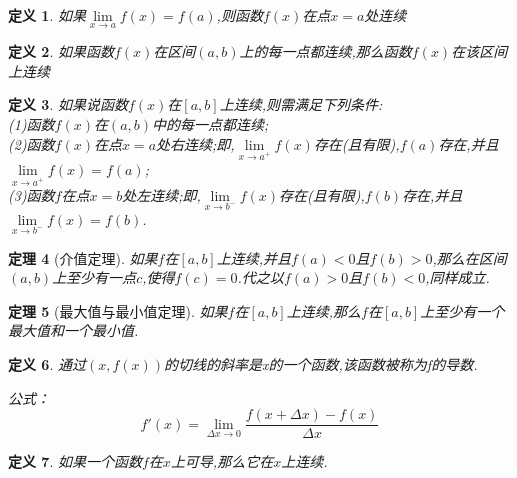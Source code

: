 \documentclass[UTF8,fontset=ubuntu]{ctexart}
\begin{document}
	\newtheorem{definition}{定义}
	\begin{definition}
		如果$\lim\limits_{x\to a}f(x)=f(a)$,则函数$f(x)$在点$x=a$处连续
	\end{definition}
	\begin{definition}
		如果函数$f(x)$在区间$(a,b)$上的每一点都连续,那么函数$f(x)$在该区间上连续
	\end{definition}
	\begin{definition}
		如果说函数$f(x)$在$[a,b]$上连续,则需满足下列条件:\\
		(1)函数$f(x)$在$(a,b)$中的每一点都连续;\\
		(2)函数$f(x)$在点$x=a$处右连续;即,$\lim\limits_{x\to a^+}f(x)$存在(且有限),$f(a)$存在,并且$\lim\limits_{x\to a^+}f(x)=f(a)$;\\
		(3)函数$f$在点$x=b$处左连续;即,$\lim\limits_{x\to b^-}f(x)$存在(且有限),$f(b)$存在,并且$\lim\limits_{x\to b^-}f(x)=f(b)$.
	\end{definition}
	\newtheorem{theorem}[definition]{定理}
	\begin{theorem}[介值定理]
		如果$f$在$[a,b]$上连续,并且$f(a)<0$且$f(b)>0$,那么在区间$(a,b)$上至少有一点$c$,使得$f(c)=0$.代之以$f(a)>0$且$f(b)<0$,同样成立.
	\end{theorem}
	\begin{theorem}[最大值与最小值定理]
		如果$f$在$[a,b]$上连续,那么$f$在$[a,b]$上至少有一个最大值和一个最小值.
	\end{theorem}
	\begin{definition}
		通过$(x,f(x))$的切线的斜率是x的一个函数,该函数被称为f的导数.\par
		公式：
		\begin{equation*}
			f'(x)=\lim_{\Delta x\to0}\frac{f(x+\Delta x)-f(x)}{\Delta x}
		\end{equation*}
	\end{definition}
	\begin{definition}
		如果一个函数$f$在$x$上可导,那么它在$x$上连续.
	\end{definition}
\end{document}
